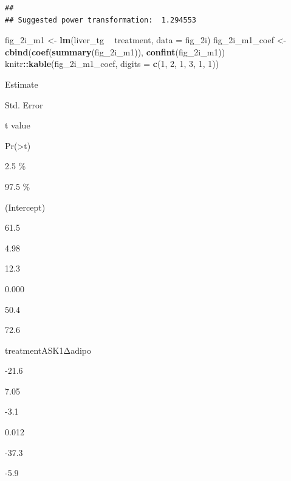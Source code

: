 \documentclass[]{book}
\newenvironment{Shaded}{\begin{snugshade}}{\end{snugshade}}
\newcommand{\DataTypeTok}[1]{\textcolor[rgb]{0.13,0.29,0.53}{#1}}
\newcommand{\DecValTok}[1]{\textcolor[rgb]{0.00,0.00,0.81}{#1}}
\newcommand{\KeywordTok}[1]{\textcolor[rgb]{0.13,0.29,0.53}{\textbf{#1}}}
\newcommand{\NormalTok}[1]{#1}
\newcommand{\OperatorTok}[1]{\textcolor[rgb]{0.81,0.36,0.00}{\textbf{#1}}}
\newcommand{\StringTok}[1]{\textcolor[rgb]{0.31,0.60,0.02}{#1}}
\begin{document}
\begin{verbatim}
## 
## Suggested power transformation:  1.294553
\end{verbatim}

\begin{Shaded}
\begin{Highlighting}[]
\NormalTok{fig_2i_m1 <-}\StringTok{ }\KeywordTok{lm}\NormalTok{(liver_tg }\OperatorTok{~}\StringTok{ }\NormalTok{treatment, }\DataTypeTok{data =}\NormalTok{ fig_2i)}
\NormalTok{fig_2i_m1_coef <-}\StringTok{ }\KeywordTok{cbind}\NormalTok{(}\KeywordTok{coef}\NormalTok{(}\KeywordTok{summary}\NormalTok{(fig_2i_m1)),}
                        \KeywordTok{confint}\NormalTok{(fig_2i_m1))}
\NormalTok{knitr}\OperatorTok{::}\KeywordTok{kable}\NormalTok{(fig_2i_m1_coef, }\DataTypeTok{digits =} \KeywordTok{c}\NormalTok{(}\DecValTok{1}\NormalTok{, }\DecValTok{2}\NormalTok{, }\DecValTok{1}\NormalTok{, }\DecValTok{3}\NormalTok{, }\DecValTok{1}\NormalTok{, }\DecValTok{1}\NormalTok{))}
\end{Highlighting}
\end{Shaded}

Estimate

Std. Error

t value

Pr(\textgreater\textbar t\textbar)

2.5 \%

97.5 \%

(Intercept)

61.5

4.98

12.3

0.000

50.4

72.6

treatmentASK1Δadipo

-21.6

7.05

-3.1

0.012

-37.3

-5.9
\end{document}
